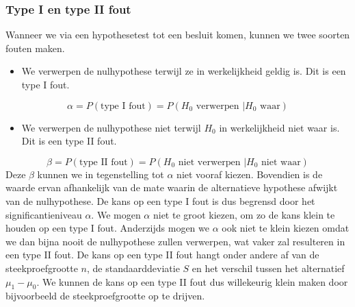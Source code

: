 \documentclass[titlepage]{article}
\numberwithin{equation}{section}
\begin{document}
\subsubsection{Type I en type II fout}
Wanneer we via een hypothesetest tot een besluit komen, kunnen we twee soorten fouten maken.
\begin{itemize}
	\item We verwerpen de nulhypothese terwijl ze in werkelijkheid geldig is. Dit is een type I fout.
\end{itemize}
\begin{equation}
	\alpha = P(\text{type I fout}) = P(H_0 \text{ verwerpen }| H_0 \text{ waar})
	\label{6.16}
\end{equation}
\begin{itemize}
	\item We verwerpen de nulhypothese niet terwijl $H_0$ in werkelijkheid niet waar is. Dit is een type II fout.
\end{itemize}
\begin{equation}
	\beta = P(\text{type II fout}) = P(H_0 \text{ niet verwerpen }| H_0 \text{ niet waar})
	\label{6.17}
\end{equation}
Deze $\beta$ kunnen we in tegenstelling tot $\alpha$ niet vooraf kiezen. Bovendien is de waarde ervan afhankelijk van de mate waarin de alternatieve hypothese afwijkt van de nulhypothese. \newline\newline
De kans op een type I fout is dus begrensd door het significantieniveau $\alpha$. We mogen $\alpha$ niet te groot kiezen, om zo de kans klein te houden op een type I fout. Anderzijds mogen we $\alpha$ ook niet te klein kiezen omdat we dan bijna nooit de nulhypothese zullen verwerpen, wat vaker zal resulteren in een type II fout. De kans op een type II fout hangt onder andere af van de steekproefgrootte $n$, de standaarddeviatie $S$ en het verschil tussen het alternatief $\mu_1 - \mu_0$. We kunnen de kans op een type II fout dus willekeurig klein maken door bijvoorbeeld de steekproefgrootte op te drijven. 
\end{document}
